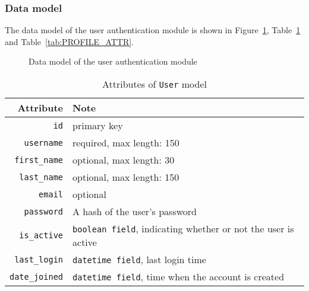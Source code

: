 \subsubsection{Data model}
The data model of the user authentication module is shown in
Figure~\ref{fig:AUTH_ER}, Table~\ref{tab:USR_ATTR} and
Table~\ref{tab:PROFILE_ATTR}.

\bigskip

\begin{figure}[ht]
    \centering
    \caption{Data model of the user authentication module}
    \usetikzlibrary{er}
    \label{fig:AUTH_ER}

\end{figure}


\begin{table}[ht]
    \centering
    \caption{Attributes of \texttt{User} model}
    \label{tab:USR_ATTR}
    \renewcommand{\arraystretch}{1.3}
    \begin{tabular}[ht]{r|l}
        \hline
        Attribute & Note \\
        \hline
        \hline
        \texttt{id} & primary key \\
        \hline
        \texttt{username} &  required, max length: 150 \\
        \hline
        \texttt{first\_name} &  optional, max length: 30 \\
        \hline
        \texttt{last\_name} &  optional, max length: 150 \\
        \hline
        \texttt{email} & optional\\
        \hline
        \texttt{password} & A hash of the user's password \\
        \hline
        \texttt{is\_active} & \texttt{boolean field}, indicating whether or not the user
            is active \\
        \hline
        \texttt{last\_login} & \texttt{datetime field}, last login time \\
        \hline
        \texttt{date\_joined} & \texttt{datetime field}, time when the account is created \\
        \hline
    \end{tabular}
    \renewcommand{\arraystretch}{1}
\end{table}

